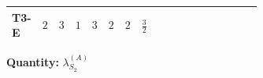 \documentclass[8pt]{article}
\begin{document}
\begin{landscape}
\begin{longtable}{@{}llcccccc >{\raggedright\arraybackslash}p{0.21\linewidth} >{\raggedright\arraybackslash}p{0.21\linewidth} >{\raggedright\arraybackslash}p{0.21\linewidth}@{}}
T3-E & $2$ & $3$ & $1$ & $3$ & $2$ & $2$ & $\frac{3}{2}$ & \scriptsize\adjustbox{max width=\linewidth}{$\begin{gathered} +\frac{3 {\lambda_{12}^{(1)}}^2}{4}\end{gathered}$} & \scriptsize\adjustbox{max width=\linewidth}{$\begin{gathered} +{\lambda_{12}^{(1)}} {\lambda_{12}^{(\times)}}\end{gathered}$} & \scriptsize\adjustbox{max width=\linewidth}{$\begin{gathered} +12 {\lambda_{12}^{(A)}}^2\end{gathered}$} \\
\midrule
\bottomrule
\end{longtable}
\clearpage
\noindent\textbf{Quantity: }$\lambda_{S_2}^{(A)}$\par\smallskip

\end{landscape}
\end{document}
